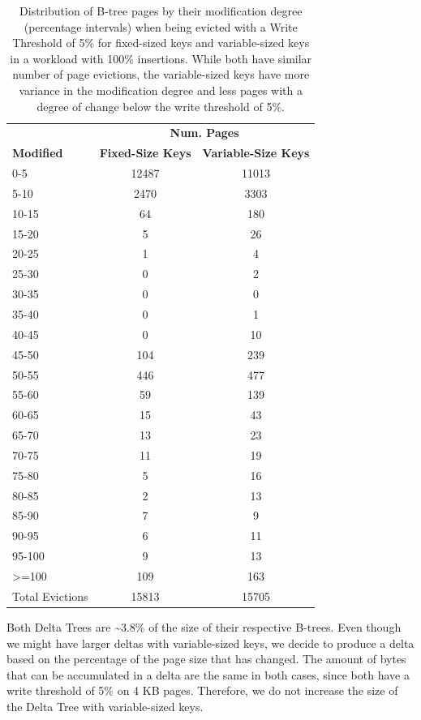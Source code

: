 \begin{table}[ht]
\centering
\begin{tabular}{l|cc}
   \toprule
    & \multicolumn{2}{c}{\textbf{Num. Pages}} \\
    \cmidrule(lr){2-3}
    \textbf{Modified} & \textbf{Fixed-Size Keys} & \textbf{Variable-Size Keys} \\
    \midrule
    0-5     & 12487 & 11013 \\
    5-10    & 2470  & 3303  \\
    10-15   & 64    & 180   \\
    15-20   & 5     & 26    \\
    20-25   & 1     & 4     \\
    25-30   & 0     & 2     \\
    30-35   & 0     & 0     \\
    35-40   & 0     & 1     \\
    40-45   & 0     & 10    \\
    45-50   & 104   & 239   \\
    50-55   & 446   & 477   \\
    55-60   & 59    & 139   \\
    60-65   & 15    & 43    \\
    65-70   & 13    & 23    \\
    70-75   & 11    & 19    \\
    75-80   & 5     & 16    \\
    80-85   & 2     & 13    \\
    85-90   & 7     & 9     \\
    90-95   & 6     & 11    \\
    95-100  & 9     & 13    \\
    >=100   & 109   & 163   \\
    \midrule
    Total Evictions & 15813 & 15705 \\
\bottomrule
\end{tabular}
\caption{Distribution of B-tree pages by their modification degree (percentage intervals) when being evicted with a Write Threshold of 5\% for fixed-sized keys and variable-sized keys in a workload with 100\% insertions. While both have similar number of page evictions, the variable-sized keys have more variance in the modification degree and less pages with a degree of change below the write threshold of 5\%.}
\label{tab:modification-degree-variable-size}
\end{table}

Both Delta Trees are \textasciitilde3.8\% of the size of their respective B-trees.
Even though we might have larger deltas with variable-sized keys, we decide to produce a delta based on the percentage of the page size that has changed.
The amount of bytes that can be accumulated in a delta are the same in both cases, since both have a write threshold of 5\% on 4 KB pages.
Therefore, we do not increase the size of the Delta Tree with variable-sized keys.


